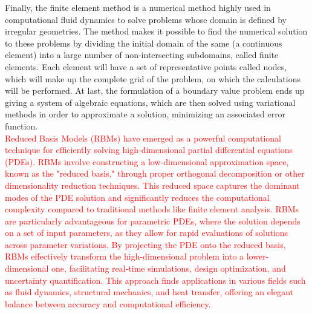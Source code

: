 \documentclass[12pt,letterpaper]{article}
\begin{document}
Finally, the finite element method is a numerical method highly used in computational fluid dynamics to solve problems whose domain is defined by irregular geometries. The method makes it possible to find the numerical solution to these problems by dividing the initial domain of the same (a continuous element) into a large number of non-intersecting subdomains, called finite elements. Each element will have a set of representative points called nodes, which will make up the complete grid of the problem, on which the calculations will be performed. At last, the formulation of a boundary value problem ends up giving a system of algebraic equations, which are then solved using variational methods in order to approximate a solution, minimizing an associated error function\cite{element}.\\

\textcolor{red}{Reduced Basis Models (RBMs) have emerged as a powerful computational technique for efficiently solving high-dimensional partial differential equations (PDEs). RBMs involve constructing a low-dimensional approximation space, known as the "reduced basis," through proper orthogonal decomposition or other dimensionality reduction techniques. This reduced space captures the dominant modes of the PDE solution and significantly reduces the computational complexity compared to traditional methods like finite element analysis. RBMs are particularly advantageous for parametric PDEs, where the solution depends on a set of input parameters, as they allow for rapid evaluations of solutions across parameter variations. By projecting the PDE onto the reduced basis, RBMs effectively transform the high-dimensional problem into a lower-dimensional one, facilitating real-time simulations, design optimization, and uncertainty quantification. This approach finds applications in various fields such as fluid dynamics, structural mechanics, and heat transfer, offering an elegant balance between accuracy and computational efficiency.}\\
\end{document}
